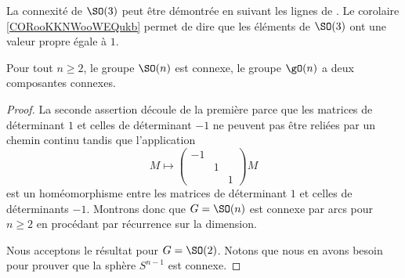 \begin{normaltext}
	La connexité de \( \SO(3)\) peut être démontrée en suivant les lignes de \cite{BIBooTMGMooRAJMcy}. Le corolaire \ref{CORooKKNWooWEQukb} permet de dire que les éléments de \( \SO(3)\) ont une valeur propre égale à \( 1\).
\end{normaltext}

\begin{theorem}     \label{THOooYQFNooPaYmaP}
	Pour tout \( n\geq 2\), le groupe \( \SO(n)\) est connexe, le groupe \( \gO(n)\) a deux composantes connexes.
\end{theorem}

\begin{proof}
	La seconde assertion découle de la première parce que les matrices de déterminant \( 1\) et celles de déterminant \( -1\) ne peuvent pas être reliées par un chemin continu tandis que l'application
	\begin{equation}
		M\mapsto \begin{pmatrix}
			-1 &   &   \\
			   & 1 &   \\
			   &   & 1
		\end{pmatrix}M
	\end{equation}
	est un homéomorphisme entre les matrices de déterminant \( 1\) et celles de déterminants \( -1\). Montrons donc que \( G=\SO(n)\) est connexe par arcs pour \( n\geq 2\) en procédant par récurrence sur la dimension.

	Nous acceptons le résultat pour \( G=\SO(2)\). Notons que nous en avons besoin pour prouver que la sphère \( S^{n-1}\) est connexe.


\end{proof}
